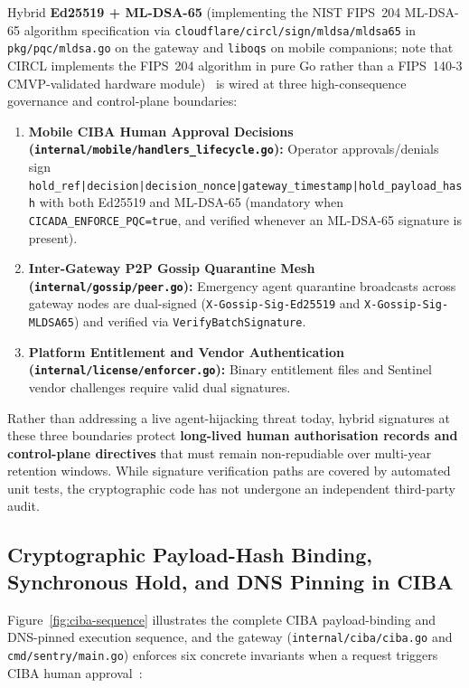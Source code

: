 \documentclass[11pt, a4paper]{article}
\begin{document}
Hybrid \textbf{Ed25519 + ML-DSA-65} (implementing the NIST FIPS~204 ML-DSA-65 algorithm specification via \texttt{cloudflare/circl/sign/mldsa/mldsa65} in \texttt{pkg/pqc/mldsa.go} on the gateway and \texttt{liboqs} on mobile companions; note that CIRCL implements the FIPS~204 algorithm in pure Go rather than a FIPS~140-3 CMVP-validated hardware module)~\cite{fips204} is wired at three high-consequence governance and control-plane boundaries:
\begin{enumerate}[label=\arabic*., leftmargin=2em]
    \item \textbf{Mobile CIBA Human Approval Decisions (\texttt{internal/mobile/handlers\_lifecycle.go}):} Operator approvals/denials sign \texttt{hold\_ref|decision|decision\_nonce|gateway\_timestamp|hold\_payload\_hash} with both Ed25519 and ML-DSA-65 (mandatory when \texttt{CICADA\_ENFORCE\_PQC=true}, and verified whenever an ML-DSA-65 signature is present).
    \item \textbf{Inter-Gateway P2P Gossip Quarantine Mesh (\texttt{internal/gossip/peer.go}):} Emergency agent quarantine broadcasts across gateway nodes are dual-signed (\texttt{X-Gossip-Sig-Ed25519} and \texttt{X-Gossip-Sig-MLDSA65}) and verified via \texttt{VerifyBatchSignature}.
    \item \textbf{Platform Entitlement and Vendor Authentication (\texttt{internal/license/enforcer.go}):} Binary entitlement files and Sentinel vendor challenges require valid dual signatures.
\end{enumerate}
Rather than addressing a live agent-hijacking threat today, hybrid signatures at these three boundaries protect \textbf{long-lived human authorisation records and control-plane directives} that must remain non-repudiable over multi-year retention windows. While signature verification paths are covered by automated unit tests, the cryptographic code has not undergone an independent third-party audit.

\subsection{Cryptographic Payload-Hash Binding, Synchronous Hold, and DNS Pinning in CIBA}
\label{subsec:ciba-hash}

Figure~\ref{fig:ciba-sequence} illustrates the complete CIBA payload-binding and DNS-pinned execution sequence, and the gateway (\texttt{internal/ciba/ciba.go} and \texttt{cmd/sentry/main.go}) enforces six concrete invariants when a request triggers CIBA human approval~\cite{ciba}:
\end{document}
